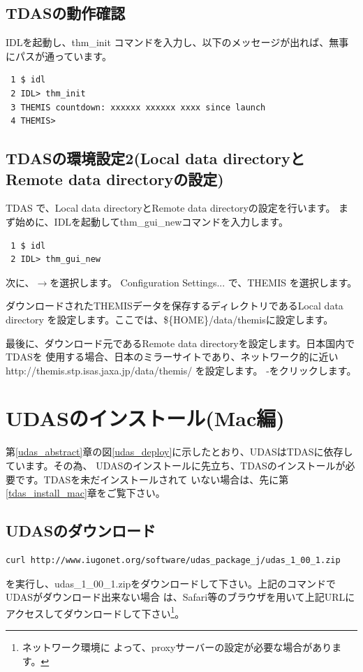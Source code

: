 \documentclass[a4j]{jbook}
\begin{document}
\section{TDASの動作確認}
IDLを起動し、thm\_init コマンドを入力し、以下のメッセージが出れば、無事にパスが通っています。
\begin{screen}
\begin{verbatim}
 1 $ idl
 2 IDL> thm_init
 3 THEMIS countdown: xxxxxx xxxxxx xxxx since launch
 4 THEMIS>  
\end{verbatim}
\end{screen}

\section{TDASの環境設定2(Local data directoryとRemote data directoryの設定)}
 TDAS で、Local data directoryとRemote data directoryの設定を行います。
まず始めに、IDLを起動してthm\_gui\_newコマンドを入力します。
\begin{screen}
\begin{verbatim}
 1 $ idl
 2 IDL> thm_gui_new
\end{verbatim}
\end{screen}
次に、$\rightarrow$を選択します。
Configuration Settings... で、THEMIS を選択します。\par
ダウンロードされたTHEMISデータを保存するディレクトリであるLocal data directory
を設定します。ここでは、\$\{HOME\}/data/themisに設定します。\par
最後に、ダウンロード元であるRemote data directoryを設定します。日本国内でTDASを
使用する場合、日本のミラーサイトであり、ネットワーク的に近い
http://themis.stp.isas.jaxa.jp/data/themis/
を設定します。
-をクリックします。



\chapter{UDASのインストール(Mac編)}
\label{udas_install_mac}

第\ref{udas_abstract}章の図\ref{udas_deploy}に示したとおり、UDASはTDASに依存しています。その為、
UDASのインストールに先立ち、TDASのインストールが必要です。TDASを未だインストールされて
いない場合は、先に第\ref{tdas_install_mac}章をご覧下さい。

\section{UDASのダウンロード}
\begin{screen}
\begin{verbatim}
curl http://www.iugonet.org/software/udas_package_j/udas_1_00_1.zip
\end{verbatim}
\end{screen}
を実行し、udas\_1\_00\_1.zipをダウンロードして下さい。上記のコマンドでUDASがダウンロード出来ない場合
は、Safari等のブラウザを用いて上記URLにアクセスしてダウンロードして下さい\footnote{ネットワーク環境に
よって、proxyサーバーの設定が必要な場合があります。}。
\end{document}
